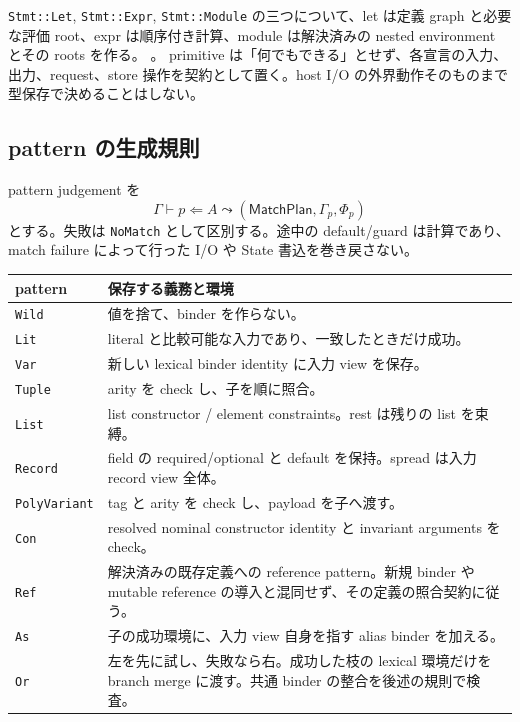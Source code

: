 \documentclass[11pt,a4paper]{article}
\theoremstyle{remark}
\newcommand{\src}[2]{\href{https://github.com/momota1029/yulang/blob/a58eefc31e22141574b6f20c6a5748151c6d79f1/#1}{\texttt{\detokenize{#2}}}}
\begin{document}
\texttt{Stmt::Let}, \texttt{Stmt::Expr}, \texttt{Stmt::Module} の三つについて、let は定義 graph と必要な評価 root、expr は順序付き計算、module は解決済みの nested environment とその roots を作る。
\src{crates/poly/src/expr.rs\#L169-L180}{statement constructors}。
primitive は「何でもできる」とせず、各宣言の入力、出力、request、store 操作を契約として置く。host I/O の外界動作そのものまで型保存で決めることはしない。

\subsection{pattern の生成規則}

pattern judgement を
\[
\Gamma\vdash p\Leftarrow A\leadsto
 (\mathsf{MatchPlan},\Gamma_p,\Phi_p)
\]
とする。失敗は \texttt{NoMatch} として区別する。途中の default/guard は計算であり、match failure によって行った I/O や State 書込を巻き戻さない。

\begin{longtable}{p{}p{}}
\toprule
pattern & 保存する義務と環境 \\
\midrule\endhead
\texttt{Wild} & 値を捨て、binder を作らない。\\
\texttt{Lit} & literal と比較可能な入力であり、一致したときだけ成功。\\
\texttt{Var} & 新しい lexical binder identity に入力 view を保存。\\
\texttt{Tuple} & arity を check し、子を順に照合。\\
\texttt{List} & list constructor / element constraints。rest は残りの list を束縛。\\
\texttt{Record} & field の required/optional と default を保持。spread は入力 record view 全体。\\
\texttt{PolyVariant} & tag と arity を check し、payload を子へ渡す。\\
\texttt{Con} & resolved nominal constructor identity と invariant arguments を check。\\
\texttt{Ref} & 解決済みの既存定義への reference pattern。新規 binder や mutable reference の導入と混同せず、その定義の照合契約に従う。\\
\texttt{As} & 子の成功環境に、入力 view 自身を指す alias binder を加える。\\
\texttt{Or} & 左を先に試し、失敗なら右。成功した枝の lexical 環境だけを branch merge に渡す。共通 binder の整合を後述の規則で検査。\\
\bottomrule
\end{longtable}
\end{document}
